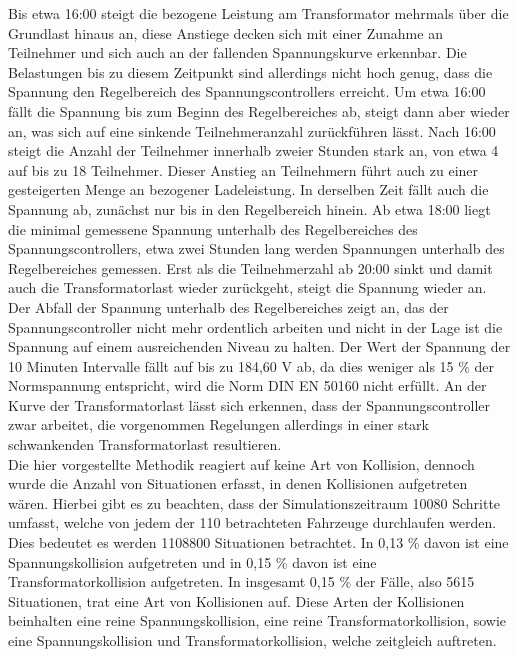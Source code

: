 Bis etwa 16:00 steigt die bezogene Leistung am Transformator mehrmals über die Grundlast hinaus an, diese Anstiege decken sich mit einer Zunahme an Teilnehmer und sich auch an der fallenden Spannungskurve erkennbar. Die Belastungen bis zu diesem Zeitpunkt sind allerdings nicht hoch genug, dass die Spannung den Regelbereich des Spannungscontrollers erreicht. Um etwa 16:00 fällt die Spannung bis zum Beginn des Regelbereiches ab, steigt dann aber wieder an, was sich auf eine sinkende Teilnehmeranzahl zurückführen lässt. Nach 16:00 steigt die Anzahl der Teilnehmer innerhalb zweier Stunden stark an, von etwa 4 auf bis zu 18 Teilnehmer. Dieser Anstieg an Teilnehmern führt auch zu einer gesteigerten Menge an bezogener Ladeleistung. In derselben Zeit fällt auch die Spannung ab, zunächst nur bis in den Regelbereich hinein. Ab etwa 18:00 liegt die minimal gemessene Spannung unterhalb des Regelbereiches des Spannungscontrollers, etwa zwei Stunden lang werden Spannungen unterhalb des Regelbereiches gemessen. Erst als die Teilnehmerzahl ab 20:00 sinkt und damit auch die Transformatorlast wieder zurückgeht, steigt die Spannung wieder an. Der Abfall der Spannung unterhalb des Regelbereiches zeigt an, das der Spannungscontroller nicht mehr ordentlich arbeiten und nicht in der Lage ist die Spannung auf einem ausreichenden Niveau zu halten. Der Wert der Spannung der 10 Minuten Intervalle fällt auf bis zu 184,60 V ab, da dies weniger als 15 \% der Normspannung entspricht, wird die Norm DIN EN 50160 nicht erfüllt. An der Kurve der Transformatorlast lässt sich erkennen, dass der Spannungscontroller zwar arbeitet, die vorgenommen Regelungen allerdings in einer stark schwankenden Transformatorlast resultieren. \\

Die hier vorgestellte Methodik reagiert auf keine Art von Kollision, dennoch wurde die Anzahl von Situationen erfasst, in denen Kollisionen aufgetreten wären. Hierbei gibt es zu beachten, dass der Simulationszeitraum 10080 Schritte umfasst, welche von jedem der 110 betrachteten Fahrzeuge durchlaufen werden. Dies bedeutet es werden 1108800 Situationen betrachtet. In 0,13 \% davon ist eine Spannungskollision aufgetreten und in 0,15 \% davon ist eine Transformatorkollision aufgetreten. In insgesamt 0,15 \% der Fälle, also 5615 Situationen, trat eine Art von Kollisionen auf. Diese Arten der Kollisionen beinhalten eine reine Spannungskollision, eine reine Transformatorkollision, sowie eine Spannungskollision und Transformatorkollision, welche zeitgleich auftreten. \\


